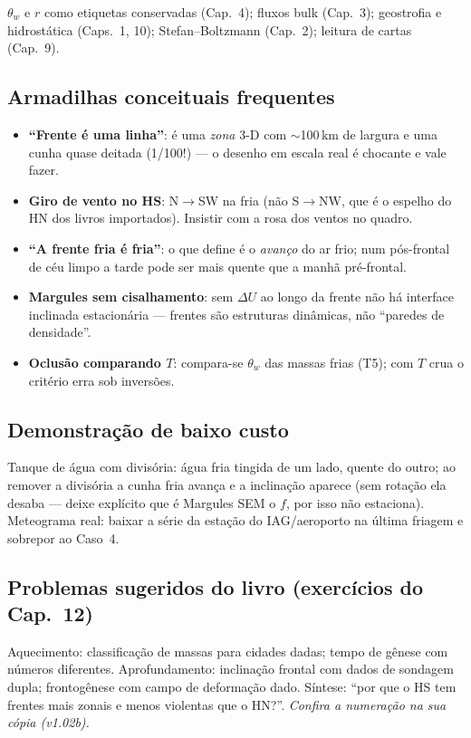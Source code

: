 $\theta_w$ e $r$ como etiquetas conservadas (Cap.~4); fluxos bulk
(Cap.~3); geostrofia e hidrostática (Caps.~1, 10); Stefan--Boltzmann
(Cap.~2); leitura de cartas (Cap.~9).

\subsection*{Armadilhas conceituais frequentes}

\begin{itemize}
  \item \textbf{``Frente é uma linha''}: é uma \emph{zona} 3-D com
        $\sim$100\,km de largura e uma cunha quase deitada (1/100!) —
        o desenho em escala real é chocante e vale fazer.
  \item \textbf{Giro de vento no HS}: N$\to$SW na fria (não S$\to$NW,
        que é o espelho do HN dos livros importados). Insistir com a
        rosa dos ventos no quadro.
  \item \textbf{``A frente fria é fria''}: o que define é o
        \emph{avanço} do ar frio; num pós-frontal de céu limpo a tarde
        pode ser mais quente que a manhã pré-frontal.
  \item \textbf{Margules sem cisalhamento}: sem $\Delta U$ ao longo da
        frente não há interface inclinada estacionária — frentes são
        estruturas dinâmicas, não ``paredes de densidade''.
  \item \textbf{Oclusão comparando $T$}: compara-se $\theta_w$ das
        massas frias (T5); com $T$ crua o critério erra sob inversões.
\end{itemize}

\subsection*{Demonstração de baixo custo}

Tanque de água com divisória: água fria tingida de um lado, quente do
outro; ao remover a divisória a cunha fria avança e a inclinação
aparece (sem rotação ela desaba — deixe explícito que é Margules SEM o
$f$, por isso não estaciona). Meteograma real: baixar a série da
estação do IAG/aeroporto na última friagem e sobrepor ao Caso~4.

\subsection*{Problemas sugeridos do livro (exercícios do Cap.~12)}

Aquecimento: classificação de massas para cidades dadas; tempo de
gênese com números diferentes. Aprofundamento: inclinação frontal com
dados de sondagem dupla; frontogênese com campo de deformação dado.
Síntese: ``por que o HS tem frentes mais zonais e menos violentas que o
HN?''. \emph{Confira a numeração na sua cópia (v1.02b).}

